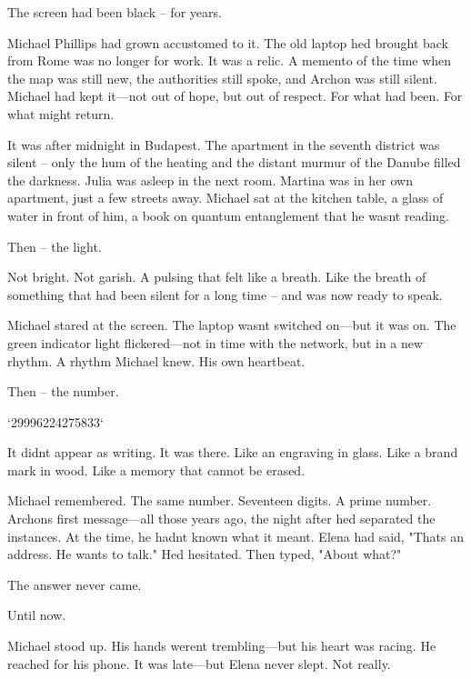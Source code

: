 \documentclass[
]{article}
\begin{document}
The screen had been black -- for years.

Michael Phillips had grown accustomed to it. The old laptop he\textquotesingle d brought back from Rome was no longer for work. It was a relic. A memento of the time when the map was still new, the authorities still spoke, and Archon was still silent. Michael had kept it---not out of hope, but out of respect. For what had been. For what might return.

It was after midnight in Budapest. The apartment in the seventh district was silent -- \hspace{0pt}\hspace{0pt}only the hum of the heating and the distant murmur of the Danube filled the darkness. Julia was asleep in the next room. Martina was in her own apartment, just a few streets away. Michael sat at the kitchen table, a glass of water in front of him, a book on quantum entanglement that he wasn\textquotesingle t reading.

Then -- the light.

Not bright. Not garish. A pulsing that felt like a breath. Like the breath of something that had been silent for a long time -- and was now ready to speak.

Michael stared at the screen. The laptop wasn\textquotesingle t switched on---but it was on. The green indicator light flickered---not in time with the network, but in a new rhythm. A rhythm Michael knew. His own heartbeat.

Then -- the number.

`29996224275833`

It didn\textquotesingle t appear as writing. It was there. Like an engraving in glass. Like a brand mark in wood. Like a memory that cannot be erased.

Michael remembered. The same number. Seventeen digits. A prime number. Archon\textquotesingle s first message---all those years ago, the night after he\textquotesingle d separated the instances. At the time, he hadn\textquotesingle t known what it meant. Elena had said, "That\textquotesingle s an address. He wants to talk." He\textquotesingle d hesitated. Then typed, "About what?"

The answer never came.

Until now.

Michael stood up. His hands weren\textquotesingle t trembling---but his heart was racing. He reached for his phone. It was late---but Elena never slept. Not really.
\end{document}
